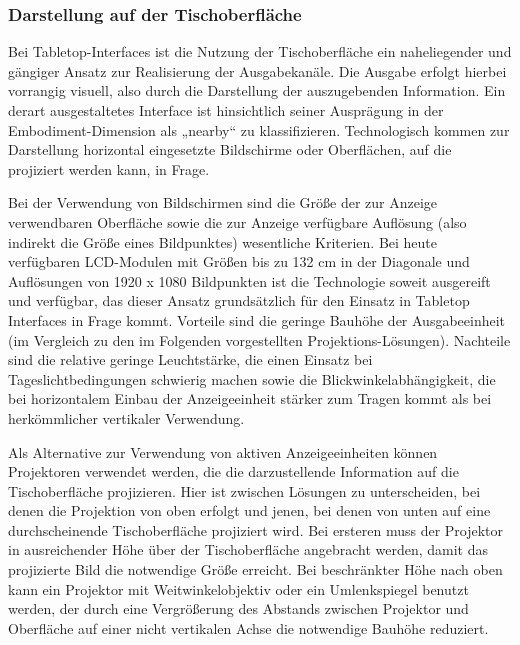 \subsubsection{Darstellung auf der Tischoberfläche} %
\label{ssub:darstellung_auf_der_tischoberfläche}

Bei Tabletop-Interfaces ist die Nutzung der Tischoberfläche ein naheliegender und gängiger  Ansatz zur Realisierung der Ausgabekanäle. Die Ausgabe erfolgt hierbei vorrangig visuell, also durch die Darstellung der auszugebenden Information. Ein derart ausgestaltetes Interface ist hinsichtlich seiner Ausprägung in der Embodiment-Dimension als „nearby“ zu klassifizieren. Technologisch kommen zur Darstellung horizontal eingesetzte Bildschirme oder Oberflächen, auf die projiziert werden kann, in Frage.

Bei der Verwendung von Bildschirmen sind die Größe der zur Anzeige verwendbaren Oberfläche sowie die zur Anzeige verfügbare Auflösung (also indirekt die Größe eines Bildpunktes) wesentliche Kriterien. Bei heute verfügbaren \gls{LCD}-Modulen mit Größen bis zu 132 cm in der Diagonale und Auflösungen von 1920 x 1080 Bildpunkten ist die Technologie soweit ausgereift und verfügbar, das dieser Ansatz grundsätzlich für den Einsatz in Tabletop Interfaces in Frage kommt. Vorteile sind die geringe Bauhöhe der Ausgabeeinheit (im Vergleich zu den im Folgenden vorgestellten Projektions-Lösungen). Nachteile sind die relative geringe Leuchtstärke, die einen Einsatz bei Tageslichtbedingungen schwierig machen sowie die Blickwinkelabhängigkeit, die bei horizontalem Einbau der Anzeigeeinheit stärker zum Tragen kommt als bei herkömmlicher vertikaler Verwendung.

Als Alternative zur Verwendung von aktiven Anzeigeeinheiten können Projektoren verwendet werden, die die darzustellende Information auf die Tischoberfläche projizieren. Hier ist zwischen Lösungen zu unterscheiden, bei denen die Projektion von oben erfolgt und jenen, bei denen von unten auf eine durchscheinende Tischoberfläche projiziert wird. Bei ersteren muss der Projektor in ausreichender Höhe über der Tischoberfläche angebracht werden, damit das projizierte Bild die notwendige Größe erreicht. Bei beschränkter Höhe nach oben kann ein Projektor mit Weitwinkelobjektiv oder ein Umlenkspiegel benutzt werden, der durch eine Vergrößerung des Abstands zwischen Projektor und Oberfläche auf einer nicht vertikalen Achse die notwendige Bauhöhe reduziert. 

